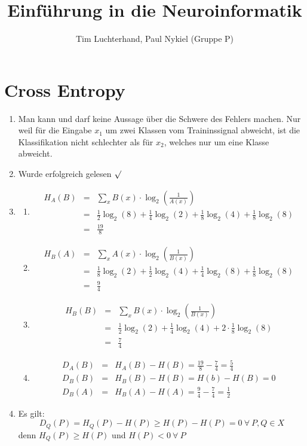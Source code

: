 \documentclass[DIN, pagenumber=false, fontsize=11pt, parskip=half]{scrartcl}
\title{Einführung in die Neuroinformatik}
\author{Tim Luchterhand, Paul Nykiel (Gruppe P)}
\begin{document}
    \maketitle
    \section{Cross Entropy}
    \begin{enumerate}
        \item Man kann und darf keine Aussage über die \glqq{}Schwere\grqq{} des Fehlers machen. Nur weil für die Eingabe $x_1$ um \glqq{}zwei Klassen\grqq{} vom Traininssignal abweicht, ist die Klassifikation nicht schlechter als für $x_2$, welches nur um eine Klasse abweicht.
		\item Wurde erfolgreich gelesen $\surd$
		\item
			\begin{enumerate}[label=(\alph*)]
				\item
					\begin{eqnarray*}
							H_A(B) &=& \sum_x{B(x)\cdot \log_2\left(\frac{1}{A(x)}\right)} \\
							&=& \frac{1}{2} \log_2(8) + \frac{1}{4} \log_2(2) + \frac{1}{8} \log_2(4) + \frac{1}{8} \log_2(8) \\
							&=&\frac{19}{8}
					\end{eqnarray*}
				\item
					\begin{eqnarray*}
							H_B(A) &=& \sum_x{A(x)\cdot \log_2\left(\frac{1}{B(x)}\right)} \\
							&=& \frac{1}{8} \log_2(2) + \frac{1}{2} \log_2(4) + \frac{1}{4} \log_2(8) + \frac{1}{8} \log_2(8) \\
							&=&\frac{9}{4}
					\end{eqnarray*}
				\item
					\begin{eqnarray*}
							H_B(B) &=& \sum_x{B(x)\cdot \log_2\left(\frac{1}{B(x)}\right)} \\
							&=& \frac{1}{2} \log_2(2) + \frac{1}{4} \log_2(4) + 2 \cdot \frac{1}{8} \log_2(8) \\
							&=&\frac{7}{4}
					\end{eqnarray*}
				\item
					\begin{eqnarray*}
							D_A(B) &=& H_A(B) - H(B) = \frac{19}{8} - \frac{7}{4} = \frac{5}{4} \\
							D_B(B) &=& H_B(B) - H(B) = H(b) - H(B) = 0 \\
							D_B(A) &=& H_B(A) - H(A) = \frac{9}{4} - \frac{7}{4} = \frac{1}{2} 
					\end{eqnarray*}
			\end{enumerate}
		\item Es gilt:
			\begin{equation*}
					D_Q(P) = H_Q(P) - H(P) \geq H(P) - H(P) = 0 \ \forall \ P,Q \in X
			\end{equation*}
			denn $H_Q(P)\geq H(P)$ und $H(P) < 0 \ \forall \ P$


\end{enumerate}
\end{document}
